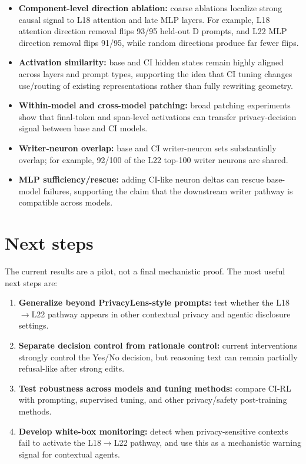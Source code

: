 \documentclass[10pt]{article}
\begin{document}
\begin{itemize}
\item \textbf{Component-level direction ablation:} coarse ablations localize strong causal signal to L18 attention and late MLP layers. For example, L18 attention direction removal flips 93/95 held-out D prompts, and L22 MLP direction removal flips 91/95, while random directions produce far fewer flips.
\item \textbf{Activation similarity:} base and CI hidden states remain highly aligned across layers and prompt types, supporting the idea that CI tuning changes use/routing of existing representations rather than fully rewriting geometry.
\item \textbf{Within-model and cross-model patching:} broad patching experiments show that final-token and span-level activations can transfer privacy-decision signal between base and CI models.
\item \textbf{Writer-neuron overlap:} base and CI writer-neuron sets substantially overlap; for example, 92/100 of the L22 top-100 writer neurons are shared.
\item \textbf{MLP sufficiency/rescue:} adding CI-like neuron deltas can rescue base-model failures, supporting the claim that the downstream writer pathway is compatible across models.
\end{itemize}

\section{Next steps}

The current results are a pilot, not a final mechanistic proof. The most useful next steps are:

\begin{enumerate}
\item \textbf{Generalize beyond PrivacyLens-style prompts:} test whether the L18$\rightarrow$L22 pathway appears in other contextual privacy and agentic disclosure settings.
\item \textbf{Separate decision control from rationale control:} current interventions strongly control the Yes/No decision, but reasoning text can remain partially refusal-like after strong edits.
\item \textbf{Test robustness across models and tuning methods:} compare CI-RL with prompting, supervised tuning, and other privacy/safety post-training methods.
\item \textbf{Develop white-box monitoring:} detect when privacy-sensitive contexts fail to activate the L18$\rightarrow$L22 pathway, and use this as a mechanistic warning signal for contextual agents.
\end{enumerate}
\end{document}
